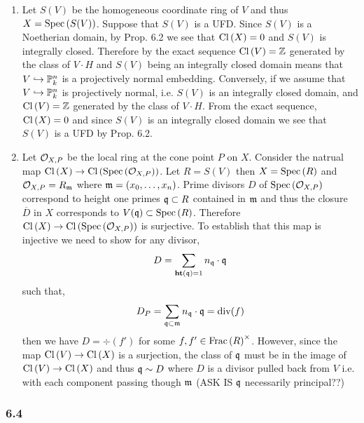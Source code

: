 \documentclass[12pt]{article}
\begin{document}
\begin{enumerate}
\item Let $S(V)$ be the homogeneous coordinate ring of $V$ and thus $X = \mathrm{Spec}\left( S(V) \right)$. Suppose that $S(V)$ is a UFD. Since $S(V)$ is a Noetherian domain, by Prop. 6.2 we see that $\mathrm{Cl} \left( X \right) = 0$ and $S(V)$ is integrally closed. Therefore by the exact sequence $\mathrm{Cl} \left( V \right) = \mathbb{Z}$ generated by the class of $V \cdot H$ and $S(V)$ being an integrally closed domain means that $V \hookrightarrow \mathbb{P}^n_k$ is a projectively normal embedding. Conversely, if we assume that $V \hookrightarrow \mathbb{P}^n_k$ is projectively normal, i.e. $S(V)$ is an integrally closed domain, and $\mathrm{Cl} \left( V \right) = \mathbb{Z}$ generated by the class of $V \cdot H$. From the exact sequence, $\mathrm{Cl} \left( X \right) = 0$ and since $S(V)$ is an integrally closed domain we see that $S(V)$ is a UFD by Prop. 6.2.  

\item Let $\mathcal{O}_{X, P}$ be the local ring at the cone point $P$ on $X$. Consider the natrual map $\mathrm{Cl} \left( X \right) \to \mathrm{Cl} \left( \mathrm{Spec}\left( \mathcal{O}_{X, P} \right) \right)$.
Let $R = S(V)$ then $X = \mathrm{Spec}\left( R \right)$ and $\mathcal{O}_{X, P} = R_{\mathfrak{m}}$ where $\mathfrak{m} = (x_0, \dots, x_n)$. Prime divisors $D$ of $\mathrm{Spec}\left( \mathcal{O}_{X, P} \right)$ correspond to height one primes $\mathfrak{q} \subset R$ contained in $\mathfrak{m}$ and thus the closure $\overline{D}$ in $X$ corresponds to $V(\mathfrak{q}) \subset \mathrm{Spec}\left( R \right)$. Therefore $\mathrm{Cl} \left( X \right) \to \mathrm{Cl} \left( \mathrm{Spec}\left( \mathcal{O}_{X, P} \right) \right)$ is surjective. To establish that this map is injective we need to show for any divisor,
\[ D = \sum_{\mathbf{ht}\left( \mathfrak{q} \right) = 1} n_{\mathfrak{q}} \cdot \mathfrak{q} \]
such that,
\[ D_P = \sum_{\mathfrak{q} \subset \mathfrak{m}} n_{\mathfrak{q}} \cdot \mathfrak{q} = \mathrm{div}{(f)} \]
then we have $D = \div{(f')}$ for some $f, f' \in \mathrm{Frac}\left(R\right)^\times$. However, since the map $\mathrm{Cl} \left( V \right) \to \mathrm{Cl} \left( X \right)$ is a surjection, the class of $\mathfrak{q}$ must be in the image of $\mathrm{Cl} \left( V \right) \to \mathrm{Cl} \left( X \right)$ and thus $\mathfrak{q} \sim D$ where $D$ is a divisor pulled back from $V$ i.e. with each component passing though $\mathfrak{m}$  (ASK IS $\mathfrak{q}$ necessarily principal??)
\end{enumerate}

\subsubsection{6.4}
\end{document}
